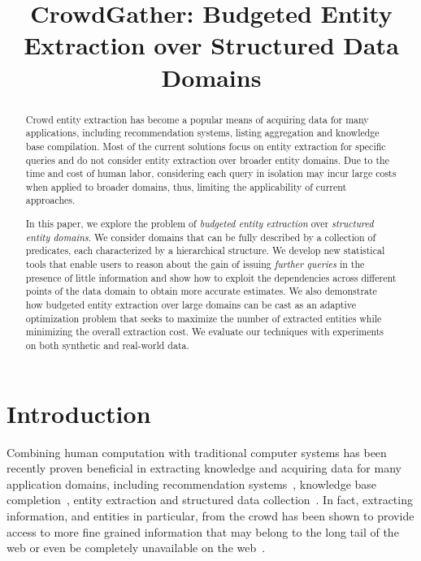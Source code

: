 \documentclass{sig-alternate}
\begin{document}

\title{CrowdGather: Budgeted Entity Extraction over Structured Data Domains}


\author{
}

\maketitle

\begin{abstract}
Crowd entity extraction has become a popular means of acquiring data for many applications, including recommendation systems, listing aggregation and knowledge base compilation.  Most of the current solutions focus on entity extraction for specific queries and do not consider entity extraction over broader entity domains. Due to the time and cost of human labor, considering each query in isolation may incur large costs when applied to broader domains, thus, limiting the applicability of current approaches.
 
In this paper, we explore the problem of {\em budgeted entity extraction} over {\em structured entity domains}. We consider domains that can be fully described by a collection of predicates, each characterized by a hierarchical structure. We develop new statistical tools that enable users to reason about the gain of issuing {\em further queries} in the presence of little information and show how to exploit the dependencies across different points of the data domain to obtain more accurate estimates. We also demonstrate how budgeted entity extraction over large domains can be cast as an adaptive optimization problem that seeks to maximize the number of extracted entities while minimizing the overall extraction cost. We evaluate our techniques with experiments on both synthetic and real-world data. 
\end{abstract}

\section{Introduction}
Combining human computation with traditional computer systems has been recently proven beneficial in extracting knowledge and acquiring data for many application domains, including recommendation systems~\cite{amsterdamer:2014}, knowledge base completion~\cite{kondredi:2014}, entity extraction and structured data collection~\cite{trushkowsky:2013, park:2014}. In fact, extracting information, and entities in particular, from the crowd has been shown to provide access to more fine grained information that may belong to the long tail of the web or even be completely unavailable on the web~\cite{west:2014}.
\end{document}
